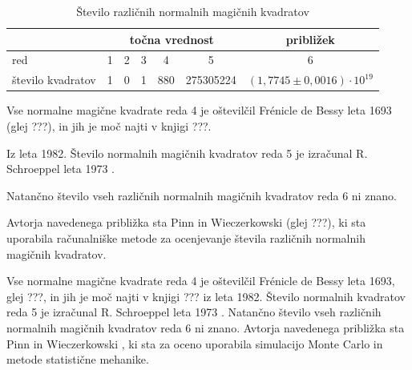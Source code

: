 \documentclass[a4paper,12pt]{article}
\theoremstyle{definition}
\theoremstyle{plain}
\begin{document}


\begin{table}[!ht]
   \centering
   \caption{Število različnih normalnih magičnih kvadratov}
   \label{stevila}
\begin{tabular}{lcccccc}\toprule    
   &\multicolumn{5}{c}{točna vrednost}&približek\\\midrule
      red&1&2&3&4&5&6\\
      število kvadratov&1&0&1&880&275305224&\((1,7745 \pm 0,0016) \cdot 10^{19}\)\\
\bottomrule
\end{tabular}
\end{table}

Vse normalne magične kvadrate reda 4 je oštevilčil
Frénicle de Bessy leta 1693 (glej ???), in jih je moč
najti v knjigi ???.

Iz leta 1982. Število normalnih magičnih kvadratov
reda 5 je izračunal R. Schroeppel leta 1973
\cite{gardner}.

Natančno število vseh različnih normalnih magičnih
kvadratov reda 6 ni znano.

Avtorja navedenega približka sta Pinn in Wieczerkowski
(glej ???), ki sta uporabila računalniške metode
za ocenjevanje števila različnih normalnih magičnih
kvadratov.


Vse normalne magične kvadrate reda 4 je oštevilčil Frénicle de Bessy
leta 1693, glej ???, in jih je moč najti v knjigi ???
iz leta 1982. Število normalnih kvadratov reda 5 je izračunal
R. Schroeppel leta 1973 \cite{gardner}.
Natančno število vseh različnih normalnih magičnih kvadratov reda 6 ni znano.
Avtorja navedenega približka sta Pinn in Wieczerkowski \cite{pinn}, ki
sta za oceno uporabila simulacijo Monte Carlo in metode statistične mehanike.
 \cite{bessy, berlekamp, gardner, pinn}


\newpage




\end{document}
